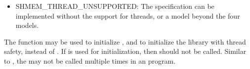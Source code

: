 \begin{apidefinition}
{\begin{itemize}
\item SHMEM\_THREAD\_UNSUPPORTED: The \openshmem{} specification 
can be implemented without the support for threads, or a model beyond the four
models.
   
\end{itemize}

The function may be used to initialize \openshmem{}, and to initialize the
\openshmem{} library with thread safety, instead of . 
If  is used for initialization, then
 should not be called. Similar to , the
may not be called multiple times in an \openshmem{} program.
}




\end{apidefinition}

 
  
